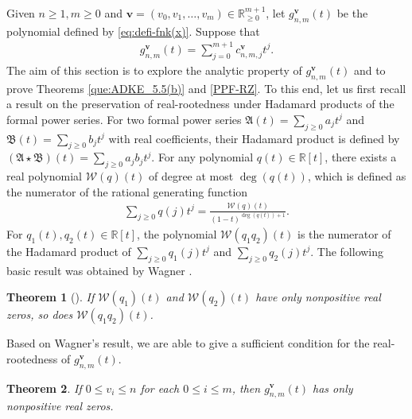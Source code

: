 \documentclass[12pt]{article}
\newtheorem{thm}{Theorem}[section]
\numberwithin{equation}{section}
\begin{document}
Given $n\geq 1, m\geq 0$ and $\mathbf{v} = (v_0, v_1, \ldots, v_m)\in \mathbb{R}_{\geq 0}^{m+1}$, let $g^{\mathbf{v}}_{n,m}(t)$ be the polynomial defined by 
\eqref{eq:defi-fnk(x)}. 
Suppose that 
\begin{align}\label{eq-g-expansion}
g^{\mathbf{v}}_{n,m}(t) = \sum_{j=0}^{m+1} c^{\mathbf{v}}_{n,m,j} t^j.
\end{align}
The aim of this section is to explore the analytic property of $g^{\mathbf{v}}_{n,m}(t)$ and to prove Theorems \ref{que:ADKE_5.5(b)} and \ref{PPF-RZ}.
To this end, let us first recall a result on the preservation of real-rootedness under Hadamard
products of the formal power series. For two formal power series $\mathfrak{A}(t)=\sum_{j\geq 0}a_jt^j$ and $\mathfrak{B}(t)=\sum_{j\geq 0}b_jt^j$ with real coefficients, their Hadamard product is defined by $(\mathfrak{A}\star \mathfrak{B})(t)=\sum_{j\geq 0}a_jb_jt^j$.
For any polynomial $q(t)\in \mathbb{R}[t]$, there exists a real polynomial $\mathcal{W}(q)(t)$ of degree at most $\deg(q(t))$, which is defined as the numerator of the rational generating function
\begin{align*}
	\sum_{j\ge 0}q(j)t^j=\frac{\mathcal{W}(q)(t)}{(1-t)^{\deg(q(t))+1}}.
\end{align*}
For $q_1(t),q_2(t)\in\mathbb{R}[t]$, the polynomial $\mathcal W(q_1q_2)(t)$ is the numerator
of the Hadamard product of $\sum_{j\geq0}q_1(j)t^j$ and $\sum_{j\geq0}q_2(j)t^j$.
The following basic result was obtained by Wagner \cite{Wagner-1992}.

\begin{thm}[{\cite[Theorem 0.2]{Wagner-1992}}]\label{wagner-thm}
    If $\mathcal{W}(q_1)(t)$ and $\mathcal{W}(q_2)(t)$ have only nonpositive real zeros, so does $\mathcal{W}(q_1q_2)(t)$.
\end{thm}
Based on Wagner's result, we are able to give a sufficient condition for the real-rootedness of $g^{\mathbf{v}}_{n,m}(t)$.

\begin{thm}\label{thm-main-realzeros} 
If $0\le v_i\leq n$ for each $0\leq i\leq m$, then $g^{\mathbf{v}}_{n,m}(t)$ has only nonpositive real zeros. 
\end{thm}
\end{document}
